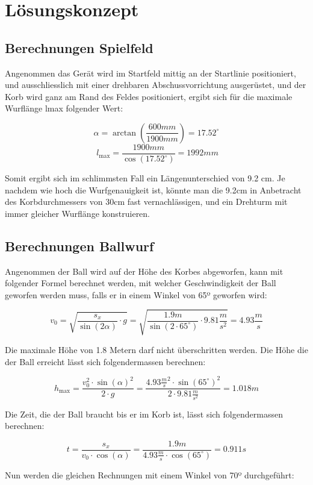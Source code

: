 \section{Lösungskonzept}

\subsection{Berechnungen Spielfeld}

Angenommen das Gerät wird im Startfeld mittig an der Startlinie positioniert, und ausschliesslich mit einer drehbaren Abschussvorrichtung ausgerüstet, und der Korb wird ganz am Rand des Feldes positioniert, ergibt sich für die maximale Wurflänge lmax folgender Wert: 
 
\[\alpha = \arctan( \frac{600mm}{1900mm}) = 17.52^\circ \]
\[\ l_\text{max} = \frac{1900mm}{\cos( 17.52^\circ)} = 1992mm \]

Somit ergibt sich im schlimmsten Fall ein Längenunterschied von 9.2 cm. Je nachdem wie hoch die Wurfgenauigkeit ist, könnte man die 9.2cm in Anbetracht des Korbdurchmessers von 30cm fast vernachlässigen, und ein Drehturm mit immer gleicher Wurflänge konstruieren.

\subsection{Berechnungen Ballwurf}

Angenommen der Ball wird auf der Höhe des Korbes abgeworfen, kann mit folgender Formel berechnet werden, mit welcher Geschwindigkeit der Ball geworfen werden muss, falls er in einem Winkel von 65º geworfen wird:

\[ v_0 = \sqrt{ \frac{s_x}{\sin(2\alpha)} \cdot g } = \sqrt{ \frac{1.9m}{\sin(2 \cdot 65^\circ)} \cdot 9.81 \frac{m}{s^2}} = 4.93 \frac{m}{s} \]

Die maximale Höhe von 1.8 Metern darf nicht überschritten werden. Die Höhe die der Ball erreicht lässt sich folgendermassen berechnen:

\[ h_\text{max} = \frac{v_0^2 \cdot \sin(\alpha)^2}{2 \cdot g} = \frac{4.93 \frac{m}{s}^2 \cdot \sin(65^\circ)^2}{2 \cdot 9.81 \frac{m}{s^2}} = 1.018m \]

Die Zeit, die der Ball braucht bis er im Korb ist, lässt sich folgendermassen berechnen:

\[ t = \frac{s_x}{v_0 \cdot \cos(\alpha)} = \frac{1.9m}{4.93 \frac{m}{s} \cdot \cos(65^\circ)} = 0.911s \]

Nun werden die gleichen Rechnungen mit einem Winkel von 70º durchgeführt:

